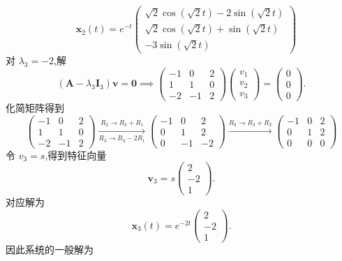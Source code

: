 \begin{questions}
\begin{solution}
\[        \quad
        \boldsymbol{x}_2(t) = e^{-t} \begin{pmatrix} \sqrt{2}\cos(\sqrt{2}t)-2\sin(\sqrt{2}t) \\ \sqrt{2}\cos(\sqrt{2}t)+\sin(\sqrt{2}t) \\ -3\sin(\sqrt{2}t) \end{pmatrix}
        \]
        对 $\lambda_3 = -2$,解
        \[
        (\boldsymbol{A} - \lambda_3 \boldsymbol{I}_3)\boldsymbol{v} = \boldsymbol{0} \implies 
        \begin{pmatrix}-1 & 0 & 2 \\ 1 & 1 & 0 \\ -2 & -1 & 2\end{pmatrix} \begin{pmatrix}v_1\\v_2\\v_3\end{pmatrix} = \begin{pmatrix}0\\0\\0\end{pmatrix}.
        \]
        化简矩阵得到
        \[
        \begin{pmatrix}-1 & 0 & 2 \\ 1 & 1 & 0 \\ -2 & -1 & 2\end{pmatrix} 
        \xrightarrow[R_3 \to R_3 - 2R_1]{R_2 \to R_2 +R_1}
        \begin{pmatrix}-1 & 0 & 2 \\ 0 & 1 & 2 \\ 0 & -1 & -2\end{pmatrix}
        \xrightarrow{R_3 \to R_3 + R_2}
        \begin{pmatrix}-1 & 0 & 2 \\ 0 & 1 & 2 \\ 0 & 0 & 0 \end{pmatrix}
        \]
        令 $v_3 = s$,得到特征向量
        \[
        \boldsymbol{v}_3 = s \begin{pmatrix}2\\-2\\1\end{pmatrix}.
        \]
        对应解为
        \[
        \boldsymbol{x}_3(t) = e^{-2t} \begin{pmatrix}2\\-2\\1\end{pmatrix}.
        \]
        因此系统的一般解为
        \begin{align*}

\end{align*}
\end{solution}
\end{questions}
